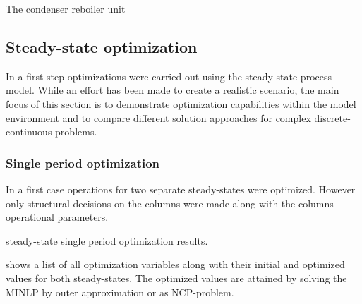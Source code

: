     The condenser reboiler unit

    \subsection{Steady-state optimization}
    In a first step optimizations were carried out using the steady-state process model. While an effort
    has been made to create a realistic scenario, the main focus of this section is to demonstrate
    optimization capabilities within the model environment \gproms and to compare different solution
    approaches for complex discrete-continuous problems.

    \subsubsection{Single period optimization}
    In a first case operations for two separate steady-states were optimized. However only structural 
    decisions on the columns were made along with the columns operational parameters.
    \begin{table}
        \center
        \footnotesize
        
        \caption{steady-state single period optimization results.}
        \label{tab:ss1_results}
    \end{table}
     shows a list of all optimization variables along with their initial and optimized values
    for both steady-states. The optimized values are attained by solving the MINLP by outer approximation or as NCP-problem.

